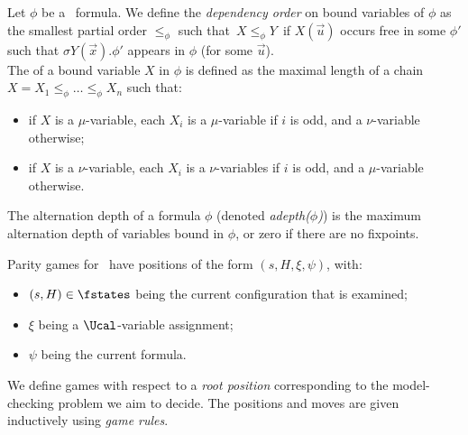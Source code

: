 \begin{definition}\label{def:altDepthNom}
    Let $\phi$ be a \fhml\ formula. 
    We define the \emph{dependency order} on bound variables of $\phi$ as the smallest partial order $\leq_\phi$ such that\
    $X \leq_\phi Y$\
    if $X(\vec u)$ occurs free in some $\phi'$ such that $\sigma Y(\vec x) .\phi'$ appears in $\phi$ (for some $\vec u$). 
    \\
    The \boldemph{alternation depth} of a 
    bound variable $X$ in $\phi$ is defined as the maximal length of a chain $X=X_1 \leq_\phi \dots \leq_\phi X_n$ such that:
    \begin{itemize}
        \item if $X$ is a $\mu$-variable, each $X_i$ is a $\mu$-variable if $i$ is odd, and a $\nu$-variable otherwise; 
    \item if $X$ is a $\nu$-variable,  each $X_i$ is a $\nu$-variables if $i$ is odd, and a $\mu$-variable otherwise. 
    \end{itemize}
    The {alternation depth} of a formula $\phi$ (denoted \emph{adepth($\phi$)}) is the maximum alternation depth of variables bound in $\phi$, or zero if there are no fixpoints.
\end{definition}

Parity games for \fhml\ have positions of the form $(s, H, \xi, \psi)$, with:
\begin{itemize}
    \item $(s, H) \in \fstates$ being the current configuration that is examined;
    \item $\xi$ being a $\Ucal$-variable assignment;
    \item $\psi$ being the current formula. 
\end{itemize}
We define games with respect to a \emph{root position} corresponding to the model-checking problem we aim to decide. The positions and moves are given inductively using \emph{game rules}.

